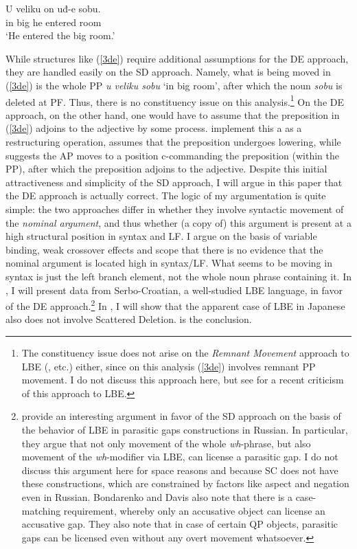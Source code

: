 \documentclass[output=paper]{langscibook}
\begin{document}
\begin{exe}
\ex \label{3de}
\gll U veliku on uđ-e   sobu.\\
in big he entered room\\
\glt ‘He entered the big room.’
\end{exe}

While structures like (\ref{3de}) require additional assumptions for the DE approach, they are handled easily on the SD approach. Namely, what is being moved in (\ref{3de}) is the whole PP \textit{u veliku sobu} ‘in big room’, after which the noun \textit{sobu} is deleted at PF. Thus, there is no constituency issue on this analysis.\footnote{The constituency issue does not arise on the \textit{Remnant Movement} approach to LBE (\citealt{FranksProgovac1994}, \citealt{bavsic2005nominal} etc.) either, since on this analysis (\ref{3de}) involves remnant PP movement. I do not discuss this approach here, but see \citet{murphy2020left} for a recent criticism of this approach to LBE. } On the DE approach, on the other hand, one would have to assume that the preposition in (\ref{3de}) adjoins to the adjective by some process. \citet{BorsleyJaworska1988} implement this a as a restructuring operation, \citet{Corver1992} assumes that the preposition undergoes lowering, while \citet{Boskovic2005} suggests the AP moves to a position c-commanding the preposition (within the PP), after which the preposition adjoins to the adjective. 
Despite this initial attractiveness and simplicity of the SD approach, I will argue in this paper that the DE approach is actually correct. The logic of my argumentation is quite simple: the two approaches differ in whether they involve syntactic movement of the \textit{nominal argument}, and thus whether (a copy of) this argument is present at a high structural position in syntax and LF. I argue on the basis of variable binding, weak crossover effects and scope that there is no evidence that the nominal argument is located high in syntax/LF. What seems to be moving in syntax is just the left branch element, not the whole noun phrase containing it. In , I will present data from Serbo-Croatian, a well-studied LBE language, in favor of the DE approach.\footnote{\citet{BondarenkoColin2018} provide an interesting argument in favor of the SD approach on the basis of the behavior of LBE in parasitic gaps constructions in Russian. In particular, they argue that not only movement of the whole \textit{wh}-phrase, but also movement of the \textit{wh}-modifier via LBE, can license a parasitic gap. I do not discuss this argument here for space reasons and because SC does not have these constructions, which are constrained by factors like aspect and negation even in Russian. Bondarenko and Davis also note that there is a case-matching requirement, whereby only an accusative object can license an accusative gap. They also note that in case of certain QP objects, parasitic gaps can be licensed even without any overt movement whatsoever.} In , I will show that the apparent case of LBE in Japanese \citep{TakahashiFunakoshi2013} also does not involve Scattered Deletion.  is the conclusion. 
\end{document}
